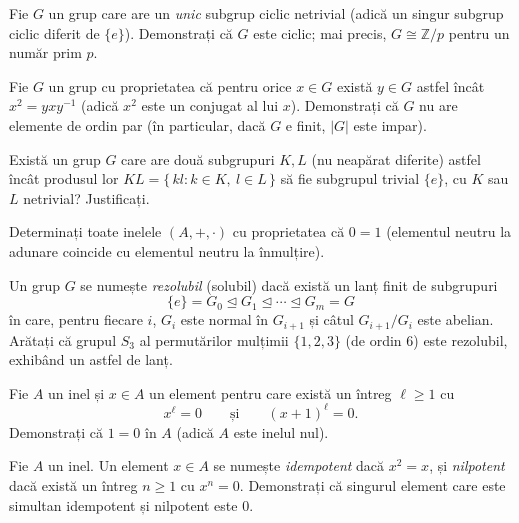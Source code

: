 \begin{problema}
Fie $G$ un grup care are un \emph{unic} subgrup ciclic netrivial (adică
un singur subgrup ciclic diferit de $\{e\}$). Demonstrați că $G$
este ciclic; mai precis, $G\cong\mathbb{Z}/p$ pentru un număr prim $p$.
\end{problema}

\begin{problema}
Fie $G$ un grup cu proprietatea că pentru orice $x\in G$ există
$y\in G$ astfel încât $x^{2}=yxy^{-1}$ (adică $x^{2}$ este un
conjugat al lui $x$). Demonstrați că $G$ nu are elemente de ordin
par (în particular, dacă $G$ e finit, $|G|$ este impar).
\end{problema}

\begin{problema}
Există un grup $G$ care are două subgrupuri $K,L$ (nu neapărat
diferite) astfel încât produsul lor $KL=\{\,kl : k\in K,\ l\in L\,\}$
să fie subgrupul trivial $\{e\}$, cu $K$ sau $L$ netrivial? Justificați.
\end{problema}

\begin{problema}
Determinați toate inelele $(A,+,\cdot)$ cu proprietatea că $0=1$
(elementul neutru la adunare coincide cu elementul neutru la înmulțire).
\end{problema}

\begin{problema}
Un grup $G$ se numește \emph{rezolubil} (solubil) dacă există un
lanț finit de subgrupuri
\[
  \{e\}=G_{0}\trianglelefteq G_{1}\trianglelefteq\cdots\trianglelefteq G_{m}=G
\]
în care, pentru fiecare $i$, $G_{i}$ este normal în $G_{i+1}$ și
câtul $G_{i+1}/G_{i}$ este abelian. Arătați că grupul $S_{3}$
al permutărilor mulțimii $\{1,2,3\}$ (de ordin $6$) este rezolubil,
exhibând un astfel de lanț.
\end{problema}

\begin{problema}
Fie $A$ un inel și $x\in A$ un element pentru care există un
întreg $\ell\ge 1$ cu
\[
  x^{\ell}=0\qquad\text{și}\qquad (x+1)^{\ell}=0 .
\]
Demonstrați că $1=0$ în $A$ (adică $A$ este inelul nul).
\end{problema}

\begin{problema}
Fie $A$ un inel. Un element $x\in A$ se numește \emph{idempotent}
dacă $x^{2}=x$, și \emph{nilpotent} dacă există un
întreg $n\ge 1$ cu $x^{n}=0$. Demonstrați că singurul element
care este simultan idempotent și nilpotent este $0$.
\end{problema}

